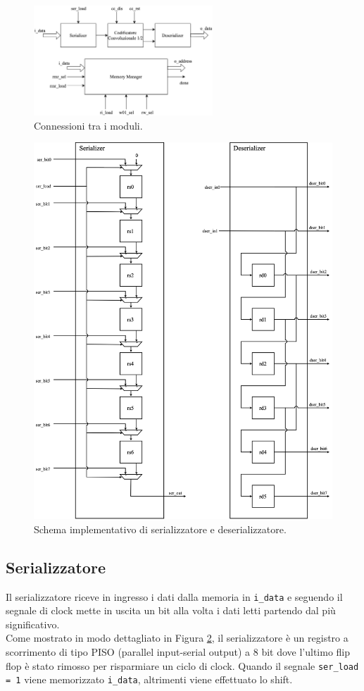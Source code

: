 \documentclass[fleqn,11pt]{article}
\begin{document}
\begin{figure}
    \centering
    \includegraphics[width=0.6\textwidth]{module_connections}
    \caption{Connessioni tra i moduli.}
    \label{fig:modgen}
\end{figure}

\begin{figure}
    \centering
    \includegraphics[height=0.7\textwidth]{ser_deser}
    \caption{Schema implementativo di serializzatore e deserializzatore.}
    \label{fig:ser_deser}
\end{figure}

\subsection{Serializzatore}
Il serializzatore riceve in ingresso i dati dalla memoria in \verb|i_data| e seguendo il segnale di clock mette in uscita un bit alla volta i dati letti partendo dal più significativo.\\
Come mostrato in modo dettagliato in Figura \ref{fig:ser_deser}, il serializzatore è un registro a scorrimento di tipo PISO (parallel input-serial output) a 8 bit dove l'ultimo flip flop è stato rimosso per risparmiare un ciclo di clock. 
Quando il segnale \verb|ser_load = 1| viene memorizzato \verb|i_data|, altrimenti viene effettuato lo shift.
\end{document}
